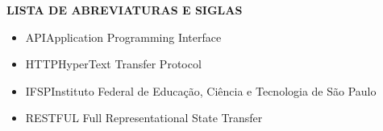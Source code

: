 \textbf{\Large\textsc{LISTA DE ABREVIATURAS E SIGLAS}}
\begin{itemize}[label={},leftmargin=*]
    \item{API\hspace{3.2cm}Application Programming Interface}
    \item{HTTP\hspace{2.8cm}HyperText Transfer Protocol}
    \item{IFSP\hspace{3cm}Instituto Federal de Educação, Ciência e Tecnologia de São Paulo}
    \item{RESTFUL\hspace{2cm} Full Representational State Transfer}
\end{itemize}
\cleardoublepage
